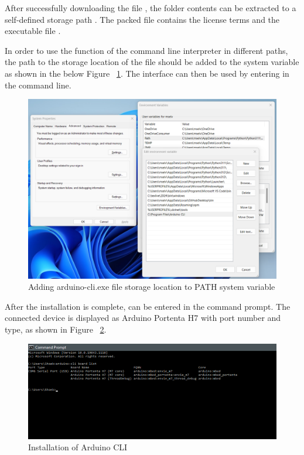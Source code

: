 \bigskip

After successfully downloading the file , the folder contents can be extracted to a self-defined storage path . The packed file contains the license terms and the executable file . 

In order to use the function of the command line interpreter in different paths, the path  to the storage location of the file  should be added to the system variable  as shown in the below Figure ~\ref{Path}. The interface can then be used by entering  in the command line.

\begin{figure}
	\begin{center}
		\includegraphics[width=0.7\linewidth]{Images/ArduinoCLI/ArduinocliPATH.png}
		\caption{Adding arduino-cli.exe file storage location to PATH system variable}
		\label{Path}
	\end{center}
\end{figure}


After the installation is complete,  can be entered in the command prompt. The connected device is displayed as Arduino Portenta H7 with port number and type, as shown in Figure ~\ref{Installation}.  

\begin{figure}
	\begin{center}
		\includegraphics[width=0.7\linewidth]{Images/ArduinoCLI/CLIInstallation.png}
		\caption{Installation of Arduino CLI}
		\label{Installation}
	\end{center}
\end{figure}

